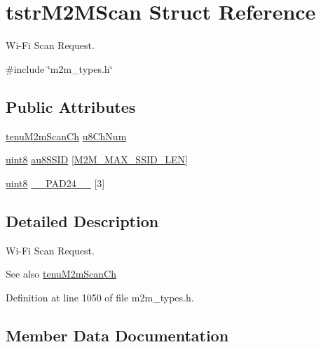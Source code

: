 \hypertarget{structtstrM2MScan}{}\section{tstr\+M2\+M\+Scan Struct Reference}
\label{structtstrM2MScan}


Wi-\/\+Fi Scan Request.  




{\ttfamily \#include \char`\"{}m2m\+\_\+types.\+h\char`\"{}}

\subsection*{Public Attributes}
\begin{DoxyCompactItemize}
\item 
\hyperlink{group__WlanEnums_ga2a91dd671e2672dba1a7ed45230f3a99}{tenu\+M2m\+Scan\+Ch} \hyperlink{structtstrM2MScan_a6157d51ded3a7c8aee449fa0ef11c6a9}{u8\+Ch\+Num}
\item 
\hyperlink{group__DataT_ga4df709a77647e870bbf1d955b8edc9a6}{uint8} \hyperlink{structtstrM2MScan_a102e537d738c9634a7a8fb04b7aaa0b6}{au8\+S\+S\+ID} \mbox{[}\hyperlink{group__WlanDefines_gab2bd95c18ede2fbc07b44c5660cc0097}{M2\+M\+\_\+\+M\+A\+X\+\_\+\+S\+S\+I\+D\+\_\+\+L\+EN}\mbox{]}
\item 
\hyperlink{group__DataT_ga4df709a77647e870bbf1d955b8edc9a6}{uint8} \hyperlink{structtstrM2MScan_a26e1eeb7d1f5b04ddc6359b851e93021}{\+\_\+\+\_\+\+P\+A\+D24\+\_\+\+\_\+} \mbox{[}3\mbox{]}
\end{DoxyCompactItemize}


\subsection{Detailed Description}
Wi-\/\+Fi Scan Request. 

\begin{DoxySeeAlso}{See also}
\hyperlink{group__WlanEnums_ga2a91dd671e2672dba1a7ed45230f3a99}{tenu\+M2m\+Scan\+Ch} 
\end{DoxySeeAlso}


Definition at line 1050 of file m2m\+\_\+types.\+h.



\subsection{Member Data Documentation}
\mbox{\label{structtstrM2MScan_a26e1eeb7d1f5b04ddc6359b851e93021}} 

